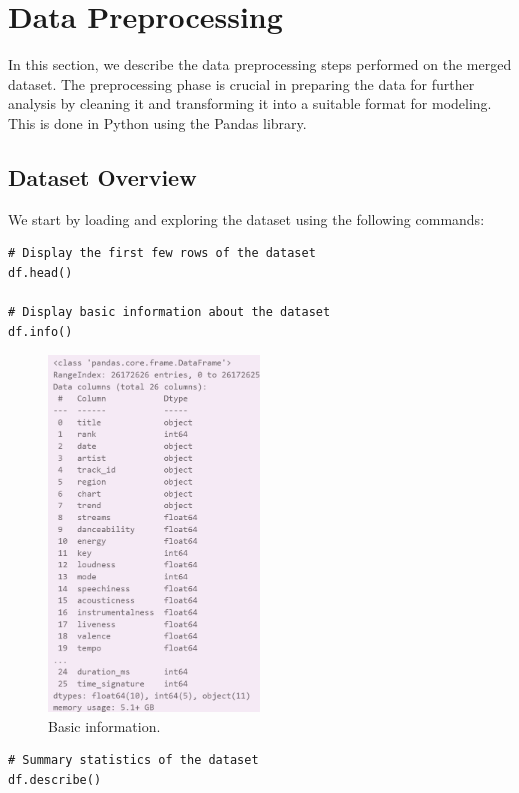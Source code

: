 \chapter{Data Preprocessing}

In this section, we describe the data preprocessing steps performed on the merged dataset. The preprocessing phase is crucial in preparing the data for further analysis by cleaning it and transforming it into a suitable format for modeling. This is done in Python using the Pandas library. 

\section{Dataset Overview}

We start by loading and exploring the dataset using the following commands:

\begin{verbatim}
# Display the first few rows of the dataset
df.head()

# Display basic information about the dataset
df.info()
\end{verbatim}

\begin{figure}[h]
    \centering
    \includegraphics[width=0.5\textwidth]{media/info.png} 
    \caption{Basic information.}
    \label{df.info()}
\end{figure}

\newpage
\begin{verbatim}
# Summary statistics of the dataset
df.describe()
\end{verbatim}


